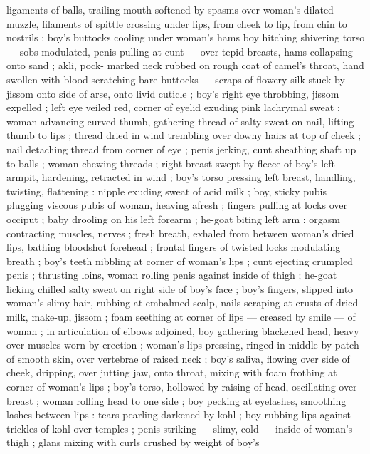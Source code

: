 ligaments of balls, trailing mouth softened by spasms over woman's 
dilated muzzle, filaments of spittle crossing under lips, from cheek to 
lip, from chin to nostrils ; boy's buttocks cooling under woman's 
hams {\col} boy hitching shivering torso --- sobs modulated, penis pulling 
at cunt --- over tepid breasts, hams collapsing onto sand ; akli, pock- 
marked neck rubbed on rough coat of camel's throat, hand swollen 
with blood scratching bare buttocks --- scraps of flowery silk stuck 
by jissom onto side of arse, onto livid cuticle ; boy's right eye 
throbbing, jissom expelled ; left eye veiled red, corner of eyelid 
exuding pink lachrymal sweat ; woman advancing curved thumb, 
gathering thread of salty sweat on nail, lifting thumb to lips ; thread 
dried in wind trembling over downy hairs at top of cheek ; nail 
detaching thread from corner of eye ; penis jerking, cunt sheathing 
shaft up to balls ; woman chewing threads ; right breast swept by 
fleece of boy's left armpit, hardening, retracted in wind ; boy's torso 
pressing left breast, handling, twisting, flattening : nipple exuding 
sweat of acid milk ; boy, sticky pubis plugging viscous pubis of 
woman, heaving afresh ; fingers pulling at locks over occiput ; baby 
drooling on his left forearm ; he-goat biting left arm : orgasm 
contracting muscles, nerves ; fresh breath, exhaled from between 
woman's dried lips, bathing bloodshot forehead ; frontal fingers of 
twisted locks modulating breath ; boy's teeth nibbling at corner of 
woman's lips ; cunt ejecting crumpled penis ; thrusting loins, woman 
rolling penis against inside of thigh ; he-goat licking chilled salty 
sweat on right side of boy's face ; boy's fingers, slipped into 
woman's slimy hair, rubbing at embalmed scalp, nails scraping at 
crusts of dried milk, make-up, jissom ; foam seething at corner of 
lips --- creased by smile --- of woman ; in articulation of elbows 
adjoined, boy gathering blackened head, heavy over muscles worn 
by erection ; woman's lips pressing, ringed in middle by patch of 
smooth skin, over vertebrae of raised neck ; boy's saliva, flowing 
over side of cheek, dripping, over jutting jaw, onto throat, mixing with 
foam frothing at corner of woman's lips ; boy's torso, hollowed by 
raising of head, oscillating over breast ; woman rolling head to one 
side ; boy pecking at eyelashes, smoothing lashes between lips : 
tears pearling darkened by kohl ; boy rubbing lips against trickles of 
kohl over temples ; penis striking --- slimy, cold --- inside of 
woman's thigh ; glans mixing with curls crushed by weight of boy's 
